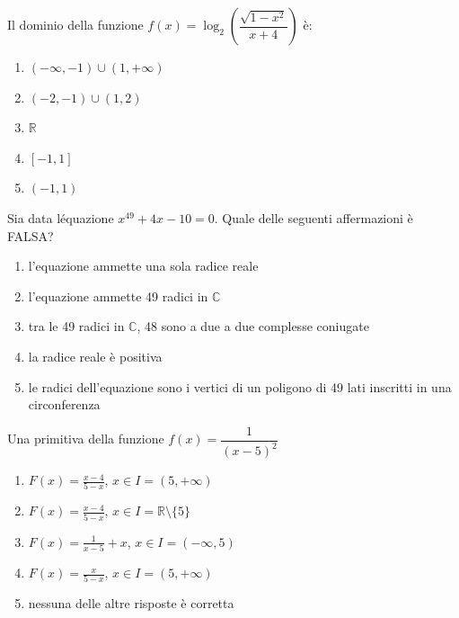 \begin{quiz}
Il dominio della funzione $f(x)=\log_2\!\left(\dfrac{\sqrt{1-x^2}}{x+4}\right)$ \`e:
\begin{enumerate}[label=\alph*),leftmargin=1.3cm,itemsep=3pt,topsep=5pt]
\item $(-\infty,-1)\cup(1,+\infty)$
\item $(-2,-1)\cup(1,2)$
\item $\mathbb R$
\item $[-1,1]$
\item $(-1,1)$
\end{enumerate}
\end{quiz}

\begin{quiz}
Sia data l\'equazione $x^{49}+4x-10=0$. Quale delle seguenti affermazioni \`e FALSA?
\begin{enumerate}[label=\alph*),leftmargin=1.3cm,itemsep=3pt,topsep=5pt]
\item l'equazione ammette una sola radice reale
\item l'equazione ammette 49 radici in $\mathbb C$
\item tra le 49 radici in $\mathbb C$, 48 sono a due a due complesse coniugate
\item la radice reale \`e positiva
\item le radici dell'equazione sono i vertici di un poligono di 49 lati inscritti in una circonferenza
\end{enumerate}
\end{quiz}

\begin{quiz}
Una primitiva della funzione $f(x)=\dfrac1{(x-5)^2}$
\begin{enumerate}[label=\alph*),leftmargin=1.3cm,itemsep=3pt,topsep=5pt]
\item $F(x)=\frac{x-4}{5-x}$, $x\in I=(5,+\infty)$
\item $F(x)=\frac{x-4}{5-x}$, $x\in I=\mathbb R\setminus\{5\}$
\item $F(x)=\frac1{x-5}+x$, $x\in I=(-\infty,5)$
\item $F(x)=\frac{x}{5-x}$, $x\in I=(5,+\infty)$
\item nessuna delle altre risposte \`e corretta
\end{enumerate}
\end{quiz}


